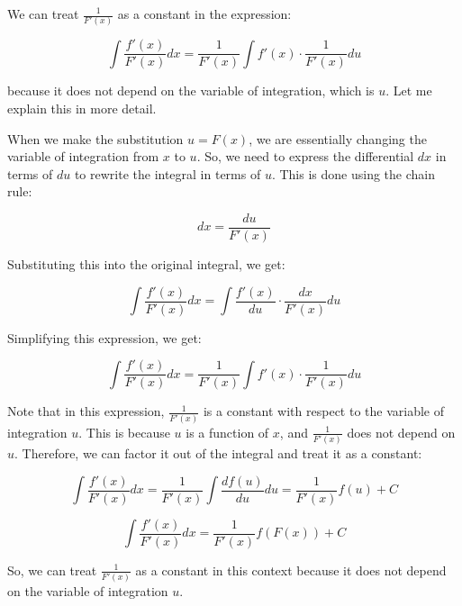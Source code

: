 \documentclass{article}
\begin{document}
We can treat $\frac{1}{F'(x)}$ as a constant in the expression:

$$\int \frac{f'(x)}{F'(x)}dx = \frac{1}{F'(x)} \int f'(x) \cdot \frac{1}{F'(x)}du$$

because it does not depend on the variable of integration, which is $u$. Let me explain this in more detail.

When we make the substitution $u = F(x)$, we are essentially changing the variable of integration from $x$ to $u$. So, we need to express the differential $dx$ in terms of $du$ to rewrite the integral in terms of $u$. This is done using the chain rule:

$$dx = \frac{du}{F'(x)}$$

Substituting this into the original integral, we get:

$$\int \frac{f'(x)}{F'(x)}dx = \int \frac{f'(x)}{du} \cdot \frac{dx}{F'(x)}du$$

Simplifying this expression, we get:

$$\int \frac{f'(x)}{F'(x)}dx = \frac{1}{F'(x)} \int f'(x) \cdot \frac{1}{F'(x)}du$$

Note that in this expression, $\frac{1}{F'(x)}$ is a constant with respect to the variable of integration $u$. This is because $u$ is a function of $x$, and $\frac{1}{F'(x)}$ does not depend on $u$. Therefore, we can factor it out of the integral and treat it as a constant:

$$\int \frac{f'(x)}{F'(x)}dx = \frac{1}{F'(x)} \int \frac{df(u)}{du}du = \frac{1}{F'(x)} f(u) + C$$

$$\int \frac{f'(x)}{F'(x)}dx = \frac{1}{F'(x)} f(F(x)) + C$$

So, we can treat $\frac{1}{F'(x)}$ as a constant in this context because it does not depend on the variable of integration $u$.
\end{document}
